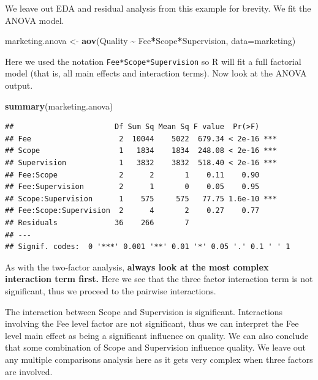 \documentclass[
]{book}
\newenvironment{Shaded}{\begin{snugshade}}{\end{snugshade}}
\newcommand{\AttributeTok}[1]{\textcolor[rgb]{0.13,0.29,0.53}{#1}}
\newcommand{\FunctionTok}[1]{\textcolor[rgb]{0.13,0.29,0.53}{\textbf{#1}}}
\newcommand{\NormalTok}[1]{#1}
\newcommand{\OtherTok}[1]{\textcolor[rgb]{0.56,0.35,0.01}{#1}}
\newcommand{\SpecialCharTok}[1]{\textcolor[rgb]{0.81,0.36,0.00}{\textbf{#1}}}
\begin{document}
We leave out EDA and residual analysis from this example for brevity. We fit the ANOVA model.

\begin{Shaded}
\begin{Highlighting}[]
\NormalTok{marketing.anova }\OtherTok{\textless{}{-}} \FunctionTok{aov}\NormalTok{(Quality }\SpecialCharTok{\textasciitilde{}}\NormalTok{ Fee}\SpecialCharTok{*}\NormalTok{Scope}\SpecialCharTok{*}\NormalTok{Supervision, }\AttributeTok{data=}\NormalTok{marketing)}
\end{Highlighting}
\end{Shaded}

Here we used the notation \texttt{Fee*Scope*Supervision} so R will fit a full factorial model (that is, all main effects and interaction terms).
Now look at the ANOVA output.

\begin{Shaded}
\begin{Highlighting}[]
\FunctionTok{summary}\NormalTok{(marketing.anova)}
\end{Highlighting}
\end{Shaded}

\begin{verbatim}
##                       Df Sum Sq Mean Sq F value  Pr(>F)    
## Fee                    2  10044    5022  679.34 < 2e-16 ***
## Scope                  1   1834    1834  248.08 < 2e-16 ***
## Supervision            1   3832    3832  518.40 < 2e-16 ***
## Fee:Scope              2      2       1    0.11    0.90    
## Fee:Supervision        2      1       0    0.05    0.95    
## Scope:Supervision      1    575     575   77.75 1.6e-10 ***
## Fee:Scope:Supervision  2      4       2    0.27    0.77    
## Residuals             36    266       7                    
## ---
## Signif. codes:  0 '***' 0.001 '**' 0.01 '*' 0.05 '.' 0.1 ' ' 1
\end{verbatim}

As with the two-factor analysis, \textbf{always look at the most complex interaction term first.}
Here we see that the three factor interaction term is not significant, thus we proceed to the pairwise interactions.

The interaction between Scope and Supervision is significant.
Interactions involving the Fee level factor are not significant, thus we can interpret the Fee level main effect as being a significant influence on quality.
We can also conclude that some combination of Scope and Supervision influence quality.
We leave out any multiple comparisons analysis here as it gets very complex when three factors are involved.
\end{document}
